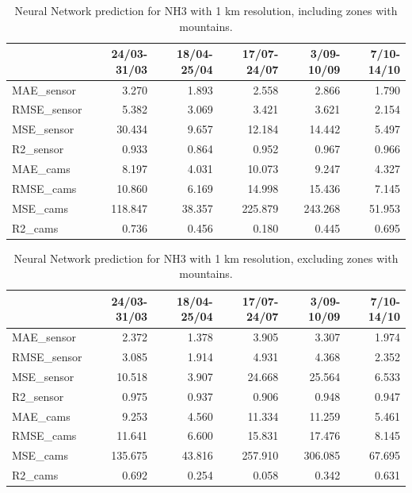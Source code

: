 \begin{table}[H]
\begin{tabular}{lrrrrr}
\toprule
 &  24/03-31/03 &  18/04-25/04 &  17/07-24/07 &  3/09-10/09 &  7/10-14/10 \\
\midrule
 MAE\_sensor &        3.270 &        1.893 &        2.558 &       2.866 &       1.790 \\
RMSE\_sensor &        5.382 &        3.069 &        3.421 &       3.621 &       2.154 \\
 MSE\_sensor &       30.434 &        9.657 &       12.184 &      14.442 &       5.497 \\
  R2\_sensor &        0.933 &        0.864 &        0.952 &       0.967 &       0.966 \\
   MAE\_cams &        8.197 &        4.031 &       10.073 &       9.247 &       4.327 \\
  RMSE\_cams &       10.860 &        6.169 &       14.998 &      15.436 &       7.145 \\
   MSE\_cams &      118.847 &       38.357 &      225.879 &     243.268 &      51.953 \\
    R2\_cams &        0.736 &        0.456 &        0.180 &       0.445 &       0.695 \\
\bottomrule
\end{tabular}
\caption{Neural Network prediction for NH3 with 1 km resolution, including zones with mountains.}
\end{table}


\begin{table}[H]
\begin{tabular}{lrrrrr}
\toprule
 &  24/03-31/03 &  18/04-25/04 &  17/07-24/07 &  3/09-10/09 &  7/10-14/10 \\
\midrule
 MAE\_sensor &        2.372 &        1.378 &        3.905 &       3.307 &       1.974 \\
RMSE\_sensor &        3.085 &        1.914 &        4.931 &       4.368 &       2.352 \\
 MSE\_sensor &       10.518 &        3.907 &       24.668 &      25.564 &       6.533 \\
  R2\_sensor &        0.975 &        0.937 &        0.906 &       0.948 &       0.947 \\
   MAE\_cams &        9.253 &        4.560 &       11.334 &      11.259 &       5.461 \\
  RMSE\_cams &       11.641 &        6.600 &       15.831 &      17.476 &       8.145 \\
   MSE\_cams &      135.675 &       43.816 &      257.910 &     306.085 &      67.695 \\
    R2\_cams &        0.692 &        0.254 &        0.058 &       0.342 &       0.631 \\
\bottomrule
\end{tabular}
\caption{Neural Network prediction for NH3 with 1 km resolution, excluding zones with mountains.}
\end{table}









